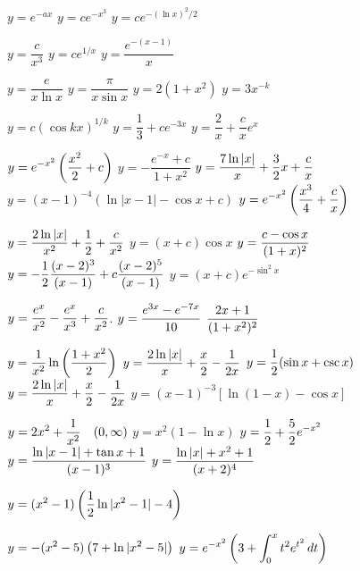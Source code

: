 
   $y=e^{-ax}$
   $y=ce^{-x^3}$
   $y=ce^{-(\ln x)^2/2}$

   $y=\dfrac{c}{x^3}$
   $y=ce^{1/x}$
    $y=\dfrac{e^{-(x-1)}}{x}$

   $y=\dfrac{e}{x\ln x}$
   $y=\dfrac{\pi}{x\sin x}$
   $y=2(1+x^2)$
   $y=3x^{-k}$

   $y=c(\cos kx)^{1/k}$
   $y=\dfrac{1}{3}+ce^{-3x}$
   $y=\dfrac{2}{x}+\dfrac{c}{x}e^x$

$\displaystyle{y=e^{-x^2}\left(\frac{x^2}{2}+c\right)}$
$y=-\dfrac{e^{-x}+c}{1+x^2}$
   $\displaystyle{y=\frac{7\ln |x|}{x}+\frac{3}{2}x + \frac{c}{x}}$
   $y=(x-1)^{-4}(\ln |x-1| -\cos
x+c)$
   $\displaystyle{y=e^{-x^2}\left(\frac{x^3}{4} + \frac{c}{x}\right)}$

   $\displaystyle{y=\frac{2\ln |x|}{x^2} +
\frac{1}{2} + \frac{c}{x^2}}$
   $y=(x+c)\cos x$
   $\displaystyle{y=\frac{c-\cos x}{(1+x)^2}}$
   $\displaystyle{y=- \frac{1}{2}\frac{(x-2)^3}{(x-1)}+c\frac{(x-2)^5}{(x-1)}}$
   $y=(x+c)e^{-\sin^2x}$

$y=\displaystyle{\frac{e^{x}}{x^{2}}-\frac{e^{x}}{x^{3}}+\frac{c}{x^{2}}}$.
 $y=\displaystyle{\frac{e^{3x}-e^{-7x}}{10}}$
   $\displaystyle{\frac{2x+1}{(1+x^{2})^{2}}}$

$y=\displaystyle{\frac{1}{x^{2}}\ln\left(\frac{1+x^{2}}{2}\right)}$
    $\displaystyle{y=\frac{2\ln |x|}{x} + \frac{x}{2} -
\frac{1}{2x}}$
   $\displaystyle{y=\frac{1}{2} (\sin x +\csc x)}$
    $y=\displaystyle{\frac{2\ln |x|}{x} + \frac{x}{2} -
\frac{1}{2x}}$
  $y=(x-1)^{-3} \left[\ln (1-x)-\cos x\right]$

   $\displaystyle{y=2x^2 + \frac{1}{x^2}  \quad (0,\infty)}$
   $y=x^2(1-\ln x)$
   $\displaystyle{y=\frac{1}{2}+\frac{5}{2}e^{-x^2}}$
  $\displaystyle{y=\frac{\ln|x-1|+\tan x+1}{(x-1)^3}}$
 $\displaystyle{y=\frac{\ln|x|+x^2+1}{(x+2)^4}}$

$\displaystyle{y=(x^2-1)\left(\displaystyle{\frac{1}{2}
\ln |x^2-1|-4}\right)}$

$\displaystyle{y=-(x^2-5)\left(7+\ln|x^2-5|\right)}$
 $\displaystyle{y=e^{-x^2}\left(3 +\int^x_0
t^2e^{t^2}\, dt\right)}$

